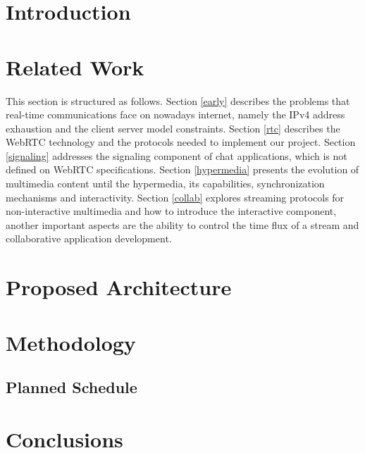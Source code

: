 \documentclass{llncs}
\begin{document}
\section{Introduction}
  

\section{Related Work}\label{related}
 This section is structured as follows.
 Section \ref{early} describes the problems that real-time communications face on nowadays internet, namely the \ac{IPv4} address exhaustion and the client server model constraints. 
 Section \ref{rtc} describes the \ac{WebRTC} technology and the protocols needed to implement our project. 
 Section \ref{signaling} addresses the signaling component of chat applications, which is not defined on \ac{WebRTC} specifications. 
 Section \ref{hypermedia} presents the evolution of multimedia content until the hypermedia, its capabilities, synchronization mechanisms and interactivity. 
 Section \ref{collab} explores streaming protocols for non-interactive multimedia and how to introduce the interactive component, another important aspects are the ability to control the time flux of a stream and collaborative application development.
        
  
  
  
  

\section{Proposed Architecture}\label{arch} %
  

\section{Methodology}\label{meth} %



		



	\subsection{Planned Schedule} %
		

\section{Conclusions}\label{concl} %
\end{document}
